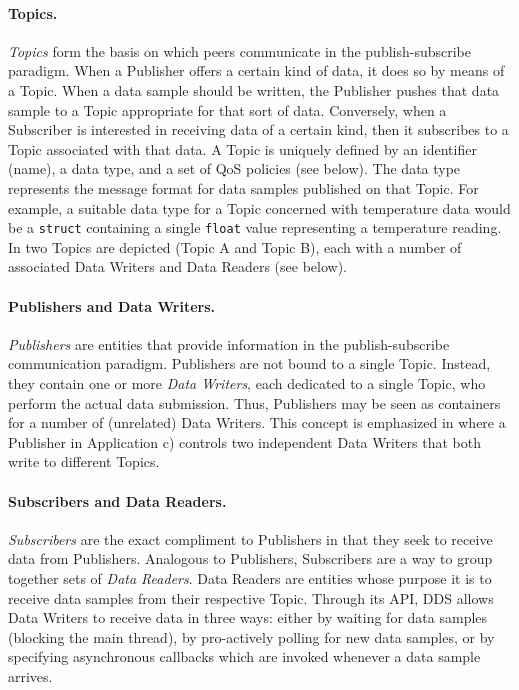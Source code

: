 \paragraph{Topics.}
\emph{Topics} form the basis on which peers communicate in the publish-subscribe paradigm. When a Publisher offers a certain kind of data, it does so by means of a Topic. When a data sample should be written, the Publisher pushes that data sample to a Topic appropriate for that sort of data. Conversely, when a Subscriber is interested in receiving data of a certain kind, then it subscribes to a Topic associated with that data. A Topic is uniquely defined by an identifier (name), a data type, and a set of QoS policies (see below). The data type represents the message format for data samples published on that Topic. For example, a suitable data type for a Topic concerned with temperature data would be a \texttt{struct} containing a single \texttt{float} value representing a temperature reading.
In  two Topics are depicted (Topic A and Topic B), each with a number of associated Data Writers and Data Readers (see below).

\paragraph{Publishers and Data Writers.}
\emph{Publishers} are entities that provide information in the publish-subscribe communication paradigm. Publishers are not bound to a single Topic. Instead, they contain one or more \emph{Data Writers}, each dedicated to a single Topic, who perform the actual data submission. Thus, Publishers may be seen as containers for a number of (unrelated) Data Writers. This concept is emphasized in  where a Publisher in Application c) controls two independent Data Writers that both write to different Topics.

\paragraph{Subscribers and Data Readers.}
\emph{Subscribers} are the exact compliment to Publishers in that they seek to receive data from Publishers. Analogous to Publishers, Subscribers are a way to group together sets of \emph{Data Readers}. Data Readers are entities whose purpose it is to receive data samples from their respective Topic. Through its API, DDS allows Data Writers to receive data in three ways: either by waiting for data samples (blocking the main thread), by pro-actively polling for new data samples, or by specifying asynchronous callbacks which are invoked whenever a data sample arrives.

